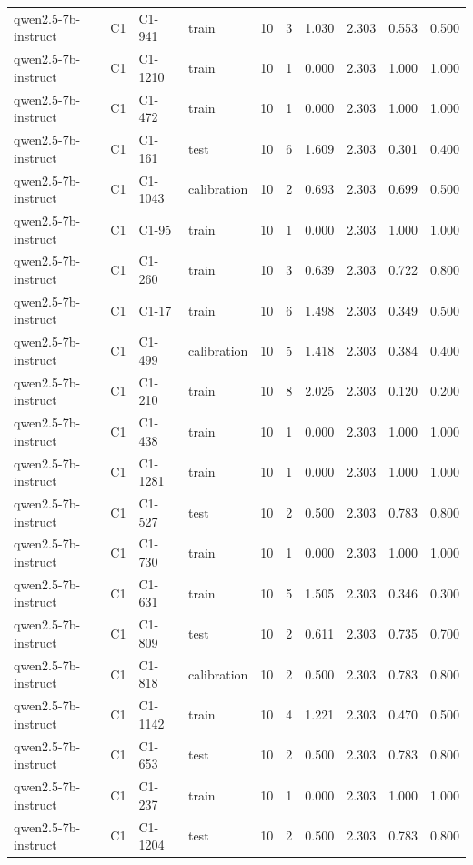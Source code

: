 \begin{table}
\begin{tabular}{llllrrrrrr}
qwen2.5-7b-instruct & C1 & C1-941 & train & 10 & 3 & 1.030 & 2.303 & 0.553 & 0.500 \\
qwen2.5-7b-instruct & C1 & C1-1210 & train & 10 & 1 & 0.000 & 2.303 & 1.000 & 1.000 \\
qwen2.5-7b-instruct & C1 & C1-472 & train & 10 & 1 & 0.000 & 2.303 & 1.000 & 1.000 \\
qwen2.5-7b-instruct & C1 & C1-161 & test & 10 & 6 & 1.609 & 2.303 & 0.301 & 0.400 \\
qwen2.5-7b-instruct & C1 & C1-1043 & calibration & 10 & 2 & 0.693 & 2.303 & 0.699 & 0.500 \\
qwen2.5-7b-instruct & C1 & C1-95 & train & 10 & 1 & 0.000 & 2.303 & 1.000 & 1.000 \\
qwen2.5-7b-instruct & C1 & C1-260 & train & 10 & 3 & 0.639 & 2.303 & 0.722 & 0.800 \\
qwen2.5-7b-instruct & C1 & C1-17 & train & 10 & 6 & 1.498 & 2.303 & 0.349 & 0.500 \\
qwen2.5-7b-instruct & C1 & C1-499 & calibration & 10 & 5 & 1.418 & 2.303 & 0.384 & 0.400 \\
qwen2.5-7b-instruct & C1 & C1-210 & train & 10 & 8 & 2.025 & 2.303 & 0.120 & 0.200 \\
qwen2.5-7b-instruct & C1 & C1-438 & train & 10 & 1 & 0.000 & 2.303 & 1.000 & 1.000 \\
qwen2.5-7b-instruct & C1 & C1-1281 & train & 10 & 1 & 0.000 & 2.303 & 1.000 & 1.000 \\
qwen2.5-7b-instruct & C1 & C1-527 & test & 10 & 2 & 0.500 & 2.303 & 0.783 & 0.800 \\
qwen2.5-7b-instruct & C1 & C1-730 & train & 10 & 1 & 0.000 & 2.303 & 1.000 & 1.000 \\
qwen2.5-7b-instruct & C1 & C1-631 & train & 10 & 5 & 1.505 & 2.303 & 0.346 & 0.300 \\
qwen2.5-7b-instruct & C1 & C1-809 & test & 10 & 2 & 0.611 & 2.303 & 0.735 & 0.700 \\
qwen2.5-7b-instruct & C1 & C1-818 & calibration & 10 & 2 & 0.500 & 2.303 & 0.783 & 0.800 \\
qwen2.5-7b-instruct & C1 & C1-1142 & train & 10 & 4 & 1.221 & 2.303 & 0.470 & 0.500 \\
qwen2.5-7b-instruct & C1 & C1-653 & test & 10 & 2 & 0.500 & 2.303 & 0.783 & 0.800 \\
qwen2.5-7b-instruct & C1 & C1-237 & train & 10 & 1 & 0.000 & 2.303 & 1.000 & 1.000 \\
qwen2.5-7b-instruct & C1 & C1-1204 & test & 10 & 2 & 0.500 & 2.303 & 0.783 & 0.800 \\

\end{tabular}
\end{table}
